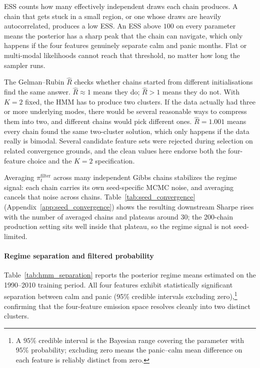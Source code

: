 ESS counts how many effectively independent draws each chain produces. A chain that gets stuck in a small region, or one whose draws are heavily autocorrelated, produces a low ESS. An ESS above $100$ on every parameter means the posterior has a sharp peak that the chain can navigate, which only happens if the four features genuinely separate calm and panic months. Flat or multi-modal likelihoods cannot reach that threshold, no matter how long the sampler runs.

The Gelman--Rubin $\hat{R}$ checks whether chains started from different initialisations find the same answer. $\hat{R} \approx 1$ means they do; $\hat{R} > 1$ means they do not. With $K=2$ fixed, the HMM has to produce two clusters. If the data actually had three or more underlying modes, there would be several reasonable ways to compress them into two, and different chains would pick different ones. $\hat{R} = 1.001$ means every chain found the same two-cluster solution, which only happens if the data really is bimodal. Several candidate feature sets were rejected during selection on related convergence grounds, and the clean values here endorse both the four-feature choice and the $K=2$ specification.

Averaging $\pi_t^{\text{filter}}$ across many independent Gibbs chains stabilizes the regime signal: each chain carries its own seed-specific MCMC noise, and averaging cancels that noise across chains. Table~\ref{tab:seed_convergence} (Appendix~\ref{app:seed_convergence}) shows the resulting downstream Sharpe rises with the number of averaged chains and plateaus around 30; the 200-chain production setting sits well inside that plateau, so the regime signal is not seed-limited.

\clearpage
\paragraph{Regime separation and filtered probability}
Table~\ref{tab:hmm_separation} reports the posterior regime means estimated on the 1990--2010 training period. All four features exhibit statistically significant separation between calm and panic (95\% credible intervals excluding zero),\footnote{A $95\%$ credible interval is the Bayesian range covering the parameter with $95\%$ probability; excluding zero means the panic--calm mean difference on each feature is reliably distinct from zero.} confirming that the four-feature emission space resolves cleanly into two distinct clusters.



